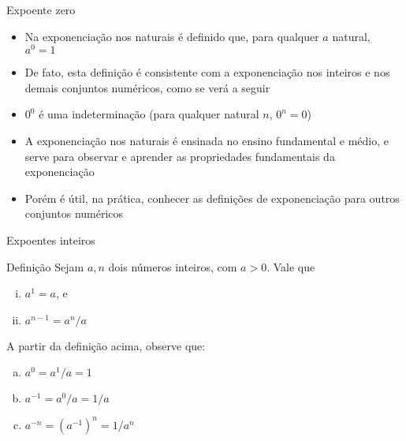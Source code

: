 \begin{frame}[fragile]{Expoente zero}

    \begin{itemize}
        \item Na exponenciação nos naturais é definido que, para qualquer $a$ natural, $a^0 = 1$ 

        \item De fato, esta definição é consistente com a exponenciação nos inteiros e nos demais conjuntos numéricos, como se verá a seguir

        \item $0^0$ é uma indeterminação (para qualquer natural $n$, $0^n = 0$)

        \item A exponenciação nos naturais é ensinada no ensino fundamental e médio, e serve para observar e aprender as propriedades fundamentais da exponenciação

        \item Porém é útil, na prática, conhecer as definições de exponenciação para outros conjuntos numéricos
    \end{itemize}

\end{frame}

\begin{frame}[fragile]{Expoentes inteiros}

    \begin{block}{Definição}
        Sejam $a, n$ dois números inteiros, com $a > 0$. Vale que

        \begin{enumerate}[(i)]
            \item $a^1 = a$, e 
            \item $a^{n - 1} = a^n / a$
        \end{enumerate}
    \end{block}

    \vspace{0.3in}

    A partir da definição acima, observe que:

        \begin{enumerate}[(a)]
            \item $a^0 = a^1 / a = 1$
            \item $a^{-1} = a^0 / a  = 1 / a$
            \item $a^{-n} = (a^{-1})^n = 1 / a^n$
        \end{enumerate}

\end{frame}

